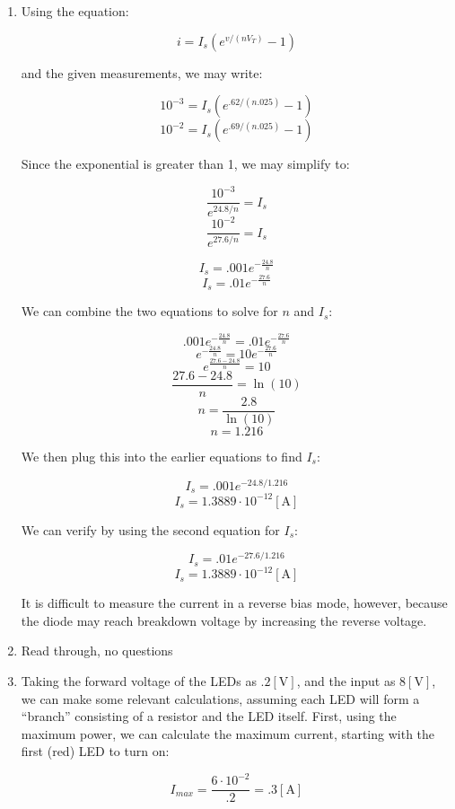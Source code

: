 \begin{enumerate}

  \item

    Using the equation:

    $$i=I_s\left( e^{v/(nV_T)}-1 \right)$$

    and the given measurements, we may write:

    $$10^{-3}=I_s\left( e^{.62/(n.025)}-1 \right)$$
    $$10^{-2}=I_s\left( e^{.69/(n.025)}-1 \right)$$

    Since the exponential is greater than 1, we may simplify to:

    $$\frac{10^{-3}}{e^{24.8/n}}=I_s$$
    $$\frac{10^{-2}}{e^{27.6/n}}=I_s$$

    $$I_s=.001e^{-\frac{24.8}{n}}$$
    $$I_s=.01e^{-\frac{27.6}{n}}$$

    We can combine the two equations to solve for $n$ and $I_s$:

    $$.001e^{-\frac{24.8}{n}}=.01e^{-\frac{27.6}{n}}$$
    $$e^{-\frac{24.8}{n}}=10e^{-\frac{27.6}{n}}$$
    $$e^{\frac{27.6-24.8}{n}}=10$$
    $$\frac{27.6-24.8}{n}=\ln(10)$$
    $$n=\frac{2.8}{\ln(10)}$$
    $$\boxed{n=1.216}$$

    We then plug this into the earlier equations to find $I_s$:

    $$I_s=.001e^{-24.8/1.216}$$
    $$\boxed{I_s=1.3889\cdot10^{-12}[\si{\ampere}]}$$

    We can verify by using the second equation for $I_s$:

    $$I_s=.01e^{-27.6/1.216}$$
    $$\boxed{I_s=1.3889\cdot10^{-12}[\si{\ampere}]}$$

    It is difficult to measure the current in a reverse bias mode, however, because the diode may reach breakdown voltage by increasing the reverse voltage.

  \item Read through, no questions \textcolor{green}{\checkmark}

  \item Taking the forward voltage of the LEDs as $.2[\si{\volt}]$, and the input as $8[\si{\volt}]$, we can make some relevant calculations, assuming each LED will form a ``branch'' consisting of a resistor and the LED itself. First, using the maximum power, we can calculate the maximum current, starting with the first (red) LED to turn on:

    $$I_{max}=\frac{6\cdot10^{-2}}{.2}=.3[\si{\ampere}]$$


\end{enumerate}

